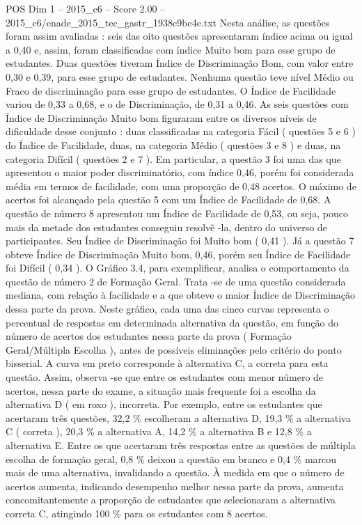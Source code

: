 \begin{textsample}{POS Dim 1 – 2015\_c6 – Score 2.00 – 2015\_c6/enade\_2015\_tec\_gastr\_1938c9be4e.txt}
Nesta análise, as questões foram assim avaliadas : seis das oito questões apresentaram índice acima ou igual a 0,40 e, assim, foram classificadas com índice Muito bom para esse grupo de estudantes.
Duas questões tiveram Índice de Discriminação Bom, com valor entre 0,30 e 0,39, para esse grupo de estudantes.
Nenhuma questão teve nível Médio ou Fraco de discriminação para esse grupo de estudantes.
O Índice de Facilidade variou de 0,33 a 0,68, e o de Discriminação, de 0,31 a 0,46.
As seis questões com Índice de Discriminação Muito bom figuraram entre os diversos níveis de dificuldade desse conjunto : duas classificadas na categoria Fácil ( questões 5 e 6 ) do Índice de Facilidade, duas, na categoria Médio ( questões 3 e 8 ) e duas, na categoria Difícil ( questões 2 e 7 ).
Em particular, a questão 3 foi uma das que apresentou o maior poder discriminatório, com índice 0,46, porém foi considerada média em termos de facilidade, com uma proporção de 0,48 acertos.
O máximo de acertos foi alcançado pela questão 5 com um Índice de Facilidade de 0,68.
A questão de número 8 apresentou um Índice de Facilidade de 0,53, ou seja, pouco mais da metade dos estudantes conseguiu resolvê -la, dentro do universo de participantes.
Seu Índice de Discriminação foi Muito bom ( 0,41 ).
Já a questão 7 obteve Índice de Discriminação Muito bom, 0,46, porém seu Índice de Facilidade foi Difícil ( 0,34 ).
O Gráfico 3.4, para exemplificar, analisa o comportamento da questão de número 2 de Formação Geral.
Trata -se de uma questão considerada mediana, com relação à facilidade e a que obteve o maior Índice de Discriminação dessa parte da prova.
Neste gráfico, cada uma das cinco curvas representa o percentual de respostas em determinada alternativa da questão, em função do número de acertos dos estudantes nessa parte da prova ( Formação Geral/Múltipla Escolha ), antes de possíveis eliminações pelo critério do ponto bisserial.
A curva em preto corresponde à alternativa C, a correta para esta questão.
Assim, observa -se que entre os estudantes com menor número de acertos, nessa parte do exame, a situação mais frequente foi a escolha da alternativa D ( em roxo ), incorreta.
Por exemplo, entre os estudantes que acertaram três questões, 32,2 \% escolheram a alternativa D, 19,3 \% a alternativa C ( correta ), 20,3 \% a alternativa A, 14,2 \% a alternativa B e 12,8 \% a alternativa E.
Entre os que acertaram três respostas entre as questões de múltipla escolha de formação geral, 0,8 \% deixou a questão em branco e 0,4 \% marcou mais de uma alternativa, invalidando a questão.
À medida em que o número de acertos aumenta, indicando desempenho melhor nessa parte da prova, aumenta concomitantemente a proporção de estudantes que selecionaram a alternativa correta C, atingindo 100 \% para os estudantes com 8 acertos.

\end{textsample}
